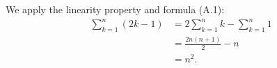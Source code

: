 We apply the linearity property and formula (A.1):
\begin{align*}
    \sum_{k=1}^n(2k-1) &= 2\sum_{k=1}^n k - \sum_{k=1}^n 1 \\
    &= \frac{2n(n+1)}{2} - n \\
    &= n^2.
\end{align*}

